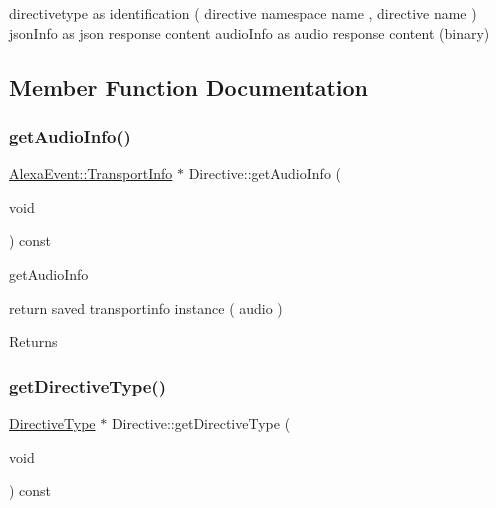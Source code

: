 directivetype as identification ( directive namespace name , directive name ) json\+Info as json response content audio\+Info as audio response content (binary) 

\subsection{Member Function Documentation}
\mbox{\label{classdirective_1_1Directive_a4ba0bb73e9db8c21061c4f102e49bfcb}} 
\subsubsection{\texorpdfstring{get\+Audio\+Info()}{getAudioInfo()}}
{\footnotesize\ttfamily \hyperlink{classAlexaEvent_1_1TransportInfo}{Alexa\+Event\+::\+Transport\+Info} $\ast$ Directive\+::get\+Audio\+Info (\begin{DoxyParamCaption}\item[{void}]{ }\end{DoxyParamCaption}) const}



get\+Audio\+Info 

return saved transportinfo instance ( audio ) \begin{DoxyReturn}{Returns}

\end{DoxyReturn}
\mbox{\label{classdirective_1_1Directive_a4bd9d57de7da2e6d1584e300051de093}} 
\subsubsection{\texorpdfstring{get\+Directive\+Type()}{getDirectiveType()}}
{\footnotesize\ttfamily \hyperlink{classdirective_1_1DirectiveType}{Directive\+Type} $\ast$ Directive\+::get\+Directive\+Type (\begin{DoxyParamCaption}\item[{void}]{ }\end{DoxyParamCaption}) const}



